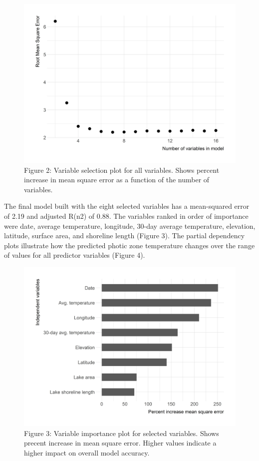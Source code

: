\documentclass[
]{article}
\begin{document}
\begin{figure}
\centering
\includegraphics{../figures/varselfig.jpg}
\caption{Figure 2: Variable selection plot for all variables. Shows
percent increase in mean square error as a function of the number of
variables.}
\end{figure}

The final model built with the eight selected variables has a
mean-squared error of 2.19 and adjusted R(n2) of 0.88. The variables
ranked in order of importance were date, average temperature, longitude,
30-day average temperature, elevation, latitude, surface area, and
shoreline length (Figure 3). The partial dependency plots illustrate how
the predicted photic zone temperature changes over the range of values
for all predictor variables (Figure 4).

\begin{figure}
\centering
\includegraphics{../figures/varImpPlot.jpg}
\caption{Figure 3: Variable importance plot for selected variables.
Shows precent increase in mean square error. Higher values indicate a
higher impact on overall model accuracy.}
\end{figure}
\end{document}
